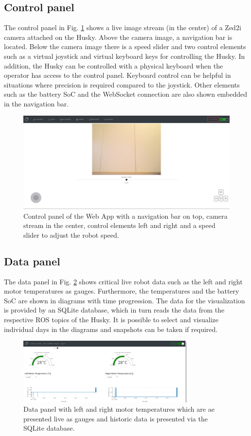 \documentclass[letterpaper, 10 pt, conference]{ieeeconf}  %
\begin{document}
\subsection{Control panel}
The control panel in Fig. \ref{fig:controlpanel} shows a live image stream (in the center) of a Zed2i camera attached on the Husky. Above the camera image, a navigation bar is located. 
Below the camera image there is a speed slider and two control elements such as a virtual joystick and virtual keyboard keys for controlling the Husky. 
In addition, the Husky can be controlled with a physical keyboard when the operator has access to the control panel. Keyboard control can be helpful in situations where precision is required compared to the joystick.
Other elements such as the battery SoC and the WebSocket connection are also shown embedded in the navigation bar.
\begin{figure}[t]
    \centerline{\includegraphics[width=0.98\columnwidth]{images/control_panel.png}}
    \caption{Control panel of the Web App with a navigation bar on top, camera stream in the center, control elements left and right and a speed slider to adjust the robot speed.}
    \label{fig:controlpanel}
\end{figure}
\subsection{Data panel}
The data panel in Fig. \ref{fig:overviewplots} shows critical live robot data such as the left and right motor temperatures as gauges. 
Furthermore, the temperatures and the battery SoC are shown in diagrams with time progression. 
The data for the visualization is provided by an SQLite database, which in turn reads the data from the respective ROS topics of the Husky. 
It is possible to select and visualize individual days in the diagrams and snapshots can be taken if required.

\begin{figure}[htbp]
    \centerline{\includegraphics[width=8.9cm]{images/overviewplots.png}}
    \caption{Data panel with left and right motor temperatures which are ae presented live as gauges and historic data is presented via the SQLite database.}
    \label{fig:overviewplots}
\end{figure}
\end{document}
